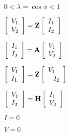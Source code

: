 \documentclass{article}
\def\lthtmlcheckvsize{\ifdim\ht\sizebox<\vsize 
  \ifdim\wd\sizebox<\hsize\expandafter\hfill\fi \expandafter\vfill
  \else\expandafter\vss\fi}%
\begin{document}
{\newpage\clearpage
{}%
$ 0 < \lambda=\cos \phi < 1$%
\lthtmlindisplaymathZ
\lthtmlcheckvsize\clearpage}

{\newpage\clearpage
{}%
$\displaystyle \left[ \begin{array}{l} V_1 \\V_2\end{array} \right]
={\bf Z}\left[ \begin{array}{l} I_1 \\I_2\end{array} \right]$%
\lthtmlindisplaymathZ
\lthtmlcheckvsize\clearpage}

{\newpage\clearpage
{}%
$\displaystyle \left[ \begin{array}{l} I_1 \\I_2\end{array} \right]
={\bf A}\left[ \begin{array}{l} V_1 \\V_2\end{array} \right]$%
\lthtmlindisplaymathZ
\lthtmlcheckvsize\clearpage}

{\newpage\clearpage
{}%
$\displaystyle \left[ \begin{array}{l} V_1 \\I_1\end{array} \right]
={\bf Z}\left[ \begin{array}{l} V_1 \\-I_2\end{array} \right]$%
\lthtmlindisplaymathZ
\lthtmlcheckvsize\clearpage}

{\newpage\clearpage
{}%
$\displaystyle \left[ \begin{array}{l} V_1 \\I_2\end{array} \right]
={\bf H}\left[ \begin{array}{l} I_1 \\V_2\end{array} \right]$%
\lthtmlindisplaymathZ
\lthtmlcheckvsize\clearpage}

{\newpage\clearpage
{}%
$ I=0$%
\lthtmlindisplaymathZ
\lthtmlcheckvsize\clearpage}

{\newpage\clearpage
{}%
$ V=0$%
\lthtmlindisplaymathZ
\lthtmlcheckvsize\clearpage}
\end{document}
